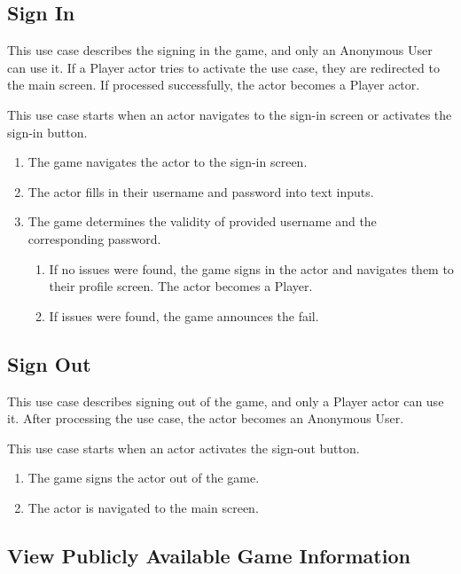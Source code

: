 \subsection{Sign In}

This use case describes the signing in the game, and only an Anonymous User can use it. If a Player actor tries to activate the use case, they are redirected to the main screen.
If processed successfully, the actor becomes a Player actor.

This use case starts when an actor navigates to the sign-in screen or activates the sign-in button.

\begin{enumerate}
    \item The game navigates the actor to the sign-in screen.
    \item The actor fills in their username and password into text inputs.
    \item The game determines the validity of provided username and the corresponding password.
    \begin{enumerate}
        \item If no issues were found, the game signs in the actor and navigates them to their profile screen. The actor becomes a Player.
        \item If issues were found, the game announces the fail.
    \end{enumerate}
\end{enumerate}

\subsection{Sign Out}

This use case describes signing out of the game, and only a Player actor can use it.
After processing the use case, the actor becomes an Anonymous User.

This use case starts when an actor activates the sign-out button.

\begin{enumerate}
    \item The game signs the actor out of the game.
    \item The actor is navigated to the main screen.
\end{enumerate}

\subsection{View Publicly Available Game Information}

